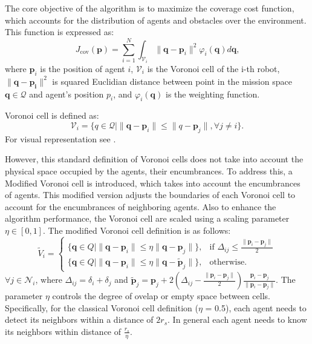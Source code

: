         The core objective of the algorithm is to maximize the coverage cost function, which accounts for the distribution of agents and obstacles over the environment. 
        This function is expressed as:
        \begin{equation}
            J_{\text{cov}}(\mathbf{p}) = \sum_{i=1}^{N} \int_{\mathcal{V}_i} \lVert\mathbf{q}-\mathbf{p}_i\rVert^2 \varphi_i (\mathbf{q})d\mathbf{q}\text{,}
            \label{coverage_cost_function}
        \end{equation}
        where $\mathbf{p}_i$ is the position of agent $i$, $\mathcal{V}_i$ is the Voronoi cell of the i-th robot, $\lVert\mathbf{q}-\mathbf{p_i}\rVert^2$ is squared Euclidian distance between point in the mission space $\mathbf{q} \in \mathcal{Q}$ and agent's position $p_i$, 
        and $\varphi_i (\mathbf{q})$ is the weighting function.

        Voronoi cell is defined as: 
        \begin{equation}
            \mathcal{V}_i = \{q \in \mathcal{Q} \lvert \lVert \mathbf{q} - \mathbf{p}_i \rVert \leq \lVert q - \mathbf{p}_j \rVert, \forall j \neq i\}\text{.}
        \end{equation}
        For visual representation see . 

        However, this standard definition of Voronoi cells does not take into account the physical space occupied by the agents, their encumbrances. 
        To address this, a Modified Voronoi cell is introduced, which takes into account the encumbrances of agents.
        This modified version adjusts the boundaries of each Voronoi cell to account for the encumbrances of neighboring agents.
        Also to enhance the algorithm performance, the Voronoi cell are scaled using a scaling parameter $\eta \in [0, 1]$.
        The modified Voronoi cell definition is as follows:
        \begin{equation}
            \label{eq:voronoi_cell_account_encum}
            \tilde{V}_i = 
            \begin{cases}
            \{ \mathbf{q} \in Q \mid \| \mathbf{q} - \mathbf{p}_i \| \leq \eta \| \mathbf{q} - \mathbf{p}_j \| \}, & \text{if } \Delta_{ij} \leq \frac{\| \mathbf{p}_i - \mathbf{p}_j \|}{2} \\
            \{ \mathbf{q} \in Q \mid \| \mathbf{q} - \mathbf{p}_i \| \leq \eta \| \mathbf{q} - \tilde{\mathbf{p}}_j \| \}, & \text{otherwise}\text{.}
            \end{cases}
        \end{equation}
        $\forall j \in \mathcal{N}_i$, where $\Delta_{ij} = \delta_i + \delta_j$ and $\tilde{\mathbf{p}}_j = \mathbf{p}_j + 2(\Delta_{ij} - \frac{\| \mathbf{p}_i - \mathbf{p}_j \|}{2})\frac{ \mathbf{p}_i - \mathbf{p}_j }{\| \mathbf{p}_i - \mathbf{p}_j \|}$.
        The parameter $\eta$ controls the degree of ovelap or empty space between cells.
        Specifically, for the classical Voronoi cell definition ($\eta$ = 0.5), each agent needs to detect its neighbors within a distance of $2r_{s}$.
        In general each agent needs to know its neighbors within distance of $\frac{r_s}{\eta}$.

